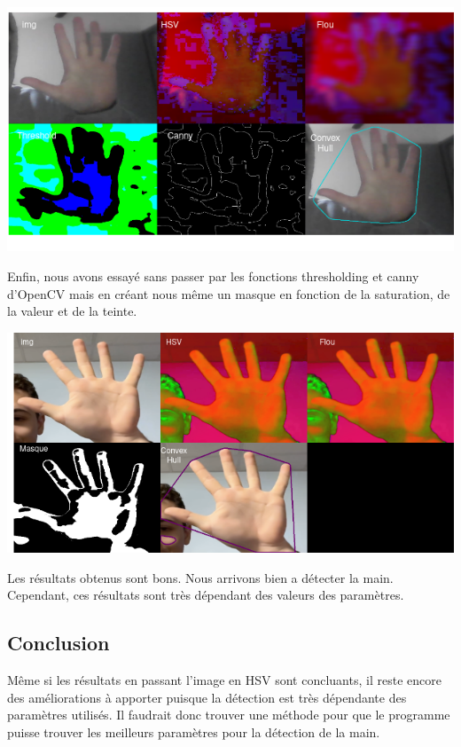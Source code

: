 \documentclass[11pt]{article}
\begin{document}
\begin{center}
    \includegraphics[width=\textwidth]{images/pre_ttt_5.png}
    \end{center}
\bigbreak

Enfin, nous avons essayé sans passer par les fonctions thresholding et canny d'OpenCV mais en créant nous même un masque en fonction de la saturation, de la valeur et de la teinte. \bigbreak

\begin{center}
    \includegraphics[width=\textwidth]{images/pre_ttt_6.png}
\end{center}
\bigbreak

Les résultats obtenus sont bons. Nous arrivons bien a détecter la main. Cependant, ces résultats sont très dépendant des valeurs des paramètres. 

\subsection{Conclusion}
Même si les résultats en passant l'image en HSV sont concluants, il reste encore des améliorations à apporter puisque la détection est très dépendante des paramètres utilisés. Il faudrait donc trouver une méthode pour que le programme puisse trouver les meilleurs paramètres pour la détection de la main. 
\end{document}
